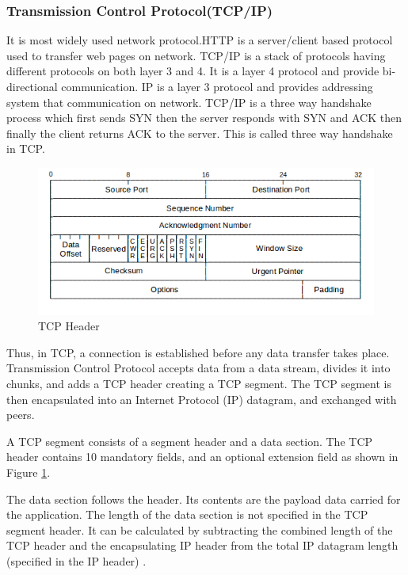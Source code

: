 \documentclass[12pt]{article}
\theoremstyle{definition}
\begin{document}
			\subsubsection{Transmission Control Protocol(TCP/IP)}
			It  is  most  widely  used network  protocol.HTTP  is  a  server/client  based  protocol used to transfer web pages on network.
			TCP/IP is a stack of protocols having different protocols on both layer 3 and 4. It   is   a   layer 4 protocol and provide bi-directional communication. IP is a layer 3 protocol  and  provides addressing system that communication on  network. TCP/IP is a three way handshake process which first sends SYN then the server responds with SYN and ACK then finally the client returns ACK to the server. This is called three way handshake in TCP.
			
			\begin{figure}[!h]
				\centering
				\includegraphics[width=400pt]{pictures/tcp_header.png}
				\caption{TCP Header\cite{AlEroud2017}}
				\label{fig:tcp-header}
			\end{figure}
			
			Thus, in TCP, a connection is established before any data transfer takes place. Transmission Control Protocol accepts data from a data stream, divides it into chunks, and adds a TCP header creating a TCP segment. The TCP segment is then encapsulated into an Internet Protocol (IP) datagram, and exchanged with peers\cite{Iqbal2016}.
			
			A TCP segment consists of a segment header and a data section. The TCP header contains 10 mandatory fields, and an optional extension field as shown in Figure \ref{fig:tcp-header}.
			
			The data section follows the header. Its contents are the payload data carried for the application. The length of the data section is not specified in the TCP segment header. It can be calculated by subtracting the combined length of the TCP header and the encapsulating IP header from the total IP datagram length (specified in the IP header) \cite{Peng2016}. 
			
\end{document}
